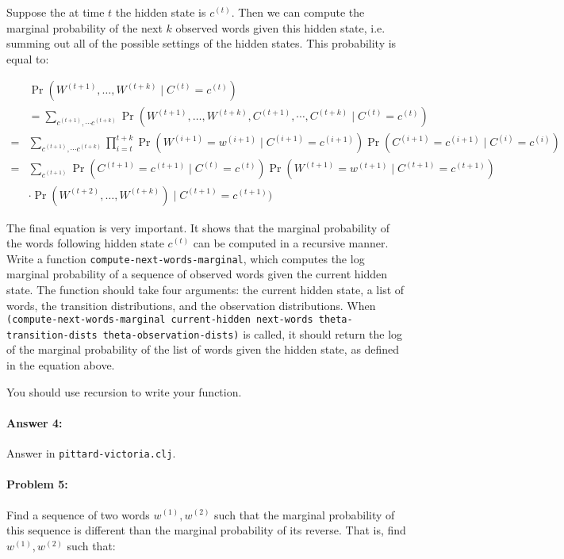 \documentclass[10pt]{article}
\begin{document}
Suppose the at time $t$ the hidden state is $c^{(t)}$. Then we can
compute the marginal probability of the next $k$ observed words
given this hidden state, i.e. summing out all of the possible settings
of the hidden states. This probability is equal to:

\begin{align}
&\Pr(W^{(t+1)},\dots,W^{(t+k)} \mid C^{(t)}=c^{(t)} )\\ 
&= \sum_{c^{(t+1)},\cdots c^{(t+k)}} \Pr(W^{(t+1)},\dots,W^{(t+k)},C^{(t+1)},\cdots,C^{(t+k)} \mid C^{(t)}=c^{(t)} ) \\
=& \sum_{c^{(t+1)},\cdots c^{(t+k)}} \prod_{i=t}^{t+k} \Pr(W^{(i+1)}=w^{(i+1)} \mid C^{(i+1)}=c^{(i+1)}) \Pr(C^{(i+1)} =c^{(i+1)}\mid C^{(i)}=c^{(i)}) \\ 
= & \sum_{c^{(t+1)}} \Pr(C^{(t+1)} =c^{(t+1)}\mid C^{(t)}=c^{(t)}) \Pr(W^{(t+1)} =w^{(t+1)}\mid C^{(t+1)}=c^{(t+1)}) \\
&\cdot \Pr(W^{(t+2)},\dots,W^{(t+k)}) \mid C^{(t+1)}=c^{(t+1)} )
\end{align}

The final equation is very important. It shows that the marginal
probability of the words following hidden state $c^{(t)}$ can be
computed in a recursive manner. Write a function
\texttt{compute-next-words-marginal}, which computes the log marginal
probability of a sequence of observed words given the current hidden
state. The function should take four arguments: the current hidden
state, a list of words, the transition distributions, and the
observation distributions. When \texttt{(compute-next-words-marginal
  current-hidden next-words theta-transition-dists
  theta-observation-dists)} is called, it should return the log of the
marginal probability of the list of words given the hidden state, as
defined in the equation above.

You should use recursion to write your function. 

\paragraph{Answer 4:} Answer in
\texttt{pittard-victoria.clj}.

\hrulefill
\paragraph{Problem 5:}
Find a sequence of two words $w^{(1)},w^{(2)}$ such that the marginal
probability of this sequence is different than the marginal
probability of its reverse. That is, find $w^{(1)},w^{(2)}$ such that:
\end{document}
